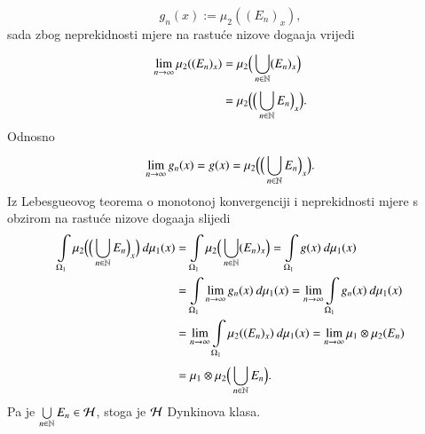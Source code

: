 \begin{rj}[\ref{zad:4.15}]
\begin{enumerate}[label=(\roman*)]
\begin{equation*}
            g_n (x) := \mu_2 ((E_n)_x),
        \end{equation*}
        sada zbog neprekidnosti mjere na rastu\' ce nizove doga\dj aja vrijedi
        \begin{equation*}
            \begin{aligned}
                \lim\limits_{n \to \infty} \mu_2 ((E_n)_x) &= \mu_2 \Big( \bigcup\limits_{n \in \mathbb{N}}^{} (E_n)_x \Big)\\
                &= \mu_2 \Big( \Big( \bigcup\limits_{n \in \mathbb{N}}^{} E_n \Big)_x \Big).
            \end{aligned}
        \end{equation*}
        Odnosno
        \begin{equation*}
            \lim\limits_{n \to \infty} g_n (x) = g (x) = \mu_2 \Big( \Big( \bigcup\limits_{n \in \mathbb{N}}^{} E_n  \Big)_x \Big).
        \end{equation*}
        Iz Lebesgueovog teorema o monotonoj konvergenciji i neprekidnosti mjere s obzirom na rastu\' ce nizove doga\dj aja slijedi
        \begin{equation*}
            \begin{aligned}
                \int\limits_{\Omega_1} \mu_2 \Big( \Big( \bigcup\limits_{n \in \mathbb{N}}^{} E_n \Big)_x \Big) \: d \mu_1 (x) &=  \int\limits_{\Omega_1} \mu_2 \Big( \bigcup\limits_{n \in \mathbb{N}}^{} (E_n)_x \Big) = \int\limits_{\Omega_1} g(x) \: d \mu_1 (x)\\
                &= \int\limits_{\Omega_1} \lim\limits_{n \to \infty} g_n (x) \: d \mu_1 (x) = \lim\limits_{n \to \infty} \int\limits_{\Omega_1} g_n (x) \: d \mu_1 (x)\\
                & = \lim\limits_{n \to \infty} \int\limits_{\Omega_1} \mu_2 ((E_n)_x) \: d \mu_1 (x) = \lim\limits_{n \to \infty} \mu_1 \otimes \mu_2 (E_n)\\
                &= \mu_1 \otimes \mu_2 \Big( \bigcup\limits_{n \in \mathbb{N}}^{} E_n \Big).
            \end{aligned}
        \end{equation*}
        Pa je $\bigcup\limits_{n \in \mathbb{N}}^{} E_n \in \mathcal{H}$, stoga je $\mathcal{H}$ Dynkinova klasa.


\end{enumerate}
\end{rj}
